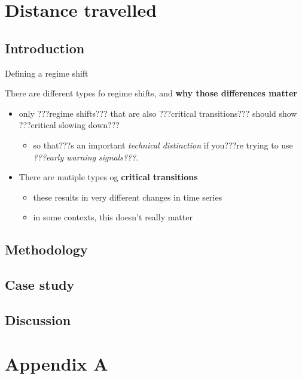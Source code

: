 \documentclass[12pt,twoside,openany]{reedthesis}
\providecommand{\tightlist}{%
  \setlength{\itemsep}{0pt}\setlength{\parskip}{0pt}}
\begin{document}
\chapter{Distance travelled}\label{distanceTravelled}

\section{Introduction}\label{introduction-3}

Defining a regime shift

There are different types fo regime shifts, and \textbf{why those
differences matter}
\begin{itemize}
\tightlist
\item
  only ???regime shifts??? that are also ???critical transitions???
  should show ???critical slowing down???
  \begin{itemize}
  \tightlist
  \item
    so that???s an important \emph{technical distinction} if you???re
    trying to use \emph{???early warning signals???}.\\
  \end{itemize}
\item
  There are mutiple types og \textbf{critical transitions}
  \begin{itemize}
  \tightlist
  \item
    these results in very different changes in time series\\
  \item
    in some contexts, this doesn't really matter
  \end{itemize}
\end{itemize}
\section{Methodology}\label{methodology}

\section{Case study}\label{case-study-1}

\section{Discussion}\label{discussion-2}

\appendix

\chapter*{Appendix A}\label{rRDM}
\end{document}
